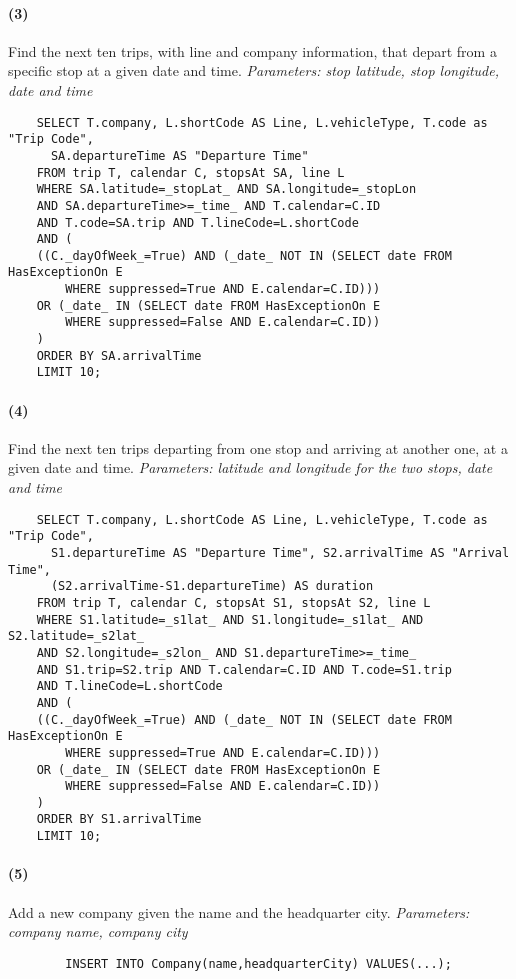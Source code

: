 	\paragraph{(3)} Find the next ten trips, with line and company information, that depart from a specific stop at a given date and time. \textit{Parameters: stop latitude, stop longitude, date and time}
	\begin{center}
		\begin{lstlisting}
	SELECT T.company, L.shortCode AS Line, L.vehicleType, T.code as "Trip Code",
	  SA.departureTime AS "Departure Time"
	FROM trip T, calendar C, stopsAt SA, line L
	WHERE SA.latitude=_stopLat_ AND SA.longitude=_stopLon
	AND SA.departureTime>=_time_ AND T.calendar=C.ID
	AND T.code=SA.trip AND T.lineCode=L.shortCode
	AND (
	((C._dayOfWeek_=True) AND (_date_ NOT IN (SELECT date FROM HasExceptionOn E
		WHERE suppressed=True AND E.calendar=C.ID)))
	OR (_date_ IN (SELECT date FROM HasExceptionOn E
		WHERE suppressed=False AND E.calendar=C.ID))
	)
	ORDER BY SA.arrivalTime
	LIMIT 10;
		\end{lstlisting}
	\end{center}

	\paragraph{(4)} Find the next ten trips departing from one stop and arriving at another one, at a given date and time. \textit{Parameters: latitude and longitude for the two stops, date and time}
	\begin{center}
		\begin{lstlisting}
	SELECT T.company, L.shortCode AS Line, L.vehicleType, T.code as "Trip Code",
	  S1.departureTime AS "Departure Time", S2.arrivalTime AS "Arrival Time",
	  (S2.arrivalTime-S1.departureTime) AS duration
	FROM trip T, calendar C, stopsAt S1, stopsAt S2, line L
	WHERE S1.latitude=_s1lat_ AND S1.longitude=_s1lat_ AND S2.latitude=_s2lat_
	AND S2.longitude=_s2lon_ AND S1.departureTime>=_time_
	AND S1.trip=S2.trip AND T.calendar=C.ID AND T.code=S1.trip
	AND T.lineCode=L.shortCode
	AND (
	((C._dayOfWeek_=True) AND (_date_ NOT IN (SELECT date FROM HasExceptionOn E
		WHERE suppressed=True AND E.calendar=C.ID)))
	OR (_date_ IN (SELECT date FROM HasExceptionOn E
		WHERE suppressed=False AND E.calendar=C.ID))
	)
	ORDER BY S1.arrivalTime
	LIMIT 10;
		\end{lstlisting}
	\end{center}

	\paragraph{(5)} Add a new company given the name and the headquarter city. \textit{Parameters: company name, company city}
	\begin{center}
		\begin{lstlisting}
		INSERT INTO Company(name,headquarterCity) VALUES(...);
		\end{lstlisting}
	\end{center}

